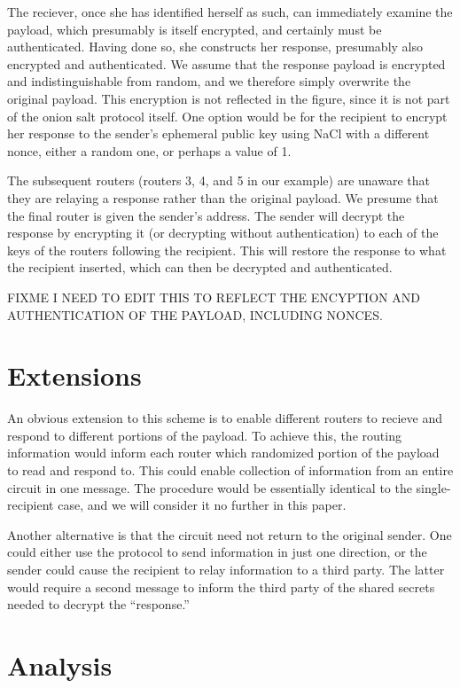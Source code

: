 \documentclass[letterpaper,twocolumn,amsmath,amssymb,pre,aps,10pt]{revtex4-1}
\begin{document}
The reciever, once she has identified herself as such, can immediately
examine the payload, which presumably is itself encrypted, and
certainly must be authenticated.  Having done so, she constructs her
response, presumably also encrypted and authenticated.  We assume that
the response payload is encrypted and indistinguishable from random,
and we therefore simply overwrite the original payload.  This
encryption is not reflected in the figure, since it is not part of the
onion salt protocol itself.  One option would be for the recipient to
encrypt her response to the sender's ephemeral public key using NaCl
with a different nonce, either a random one, or perhaps a value of 1.

The subsequent routers (routers 3, 4, and 5 in our example) are
unaware that they are relaying a response rather than the original
payload.  We presume that the final router is given the sender's
address.  The sender will decrypt the response by encrypting it (or
decrypting without authentication) to each of the keys of the routers
following the recipient.  This will restore the response to what the
recipient inserted, which can then be decrypted and authenticated.

FIXME I NEED TO EDIT THIS TO REFLECT THE ENCYPTION AND AUTHENTICATION
OF THE PAYLOAD, INCLUDING NONCES.

\section{Extensions}

An obvious extension to this scheme is to enable different routers to
recieve and respond to different portions of the payload.  To achieve
this, the routing information would inform each router which
randomized portion of the payload to read and respond to. This could
enable collection of information from an entire circuit in one
message.  The procedure would be essentially identical to the
single-recipient case, and we will consider it no further in this
paper.

Another alternative is that the circuit need not return to the
original sender.  One could either use the protocol to send
information in just one direction, or the sender could cause the
recipient to relay information to a third party.  The latter would
require a second message to inform the third party of the shared
secrets needed to decrypt the ``response.''

\section{Analysis}
\end{document}
